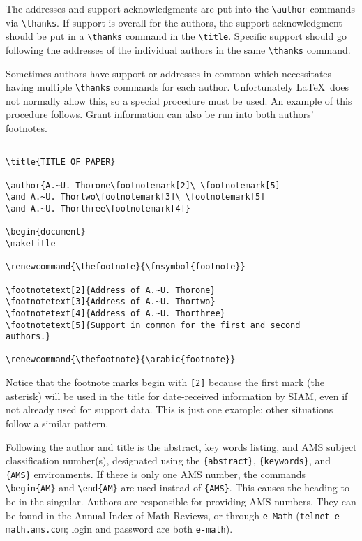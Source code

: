 \documentclass[final,leqno,onefignum,onetabnum]{siamltex1213}
\begin{document}
The addresses and support acknowledgments are put into the
\verb|\author| commands via \verb|\thanks|. If support is
overall for the authors, the support acknowledgment should
be put in a \verb|\thanks| command in the \verb|\title|.
Specific support should go following the addresses of the
individual authors in the same \verb|\thanks| command.

Sometimes authors have support or addresses in common which
necessitates having multiple \verb|\thanks| commands for
each author. Unfortunately \LaTeX\ does not normally allow this, 
so a special procedure must be used. An example of this procedure
follows. Grant information can also be run into both authors' 
footnotes.

\begin{verbatim}

\title{TITLE OF PAPER}

\author{A.~U. Thorone\footnotemark[2]\ \footnotemark[5]
\and A.~U. Thortwo\footnotemark[3]\ \footnotemark[5]
\and A.~U. Thorthree\footnotemark[4]}

\begin{document}
\maketitle

\renewcommand{\thefootnote}{\fnsymbol{footnote}}

\footnotetext[2]{Address of A.~U. Thorone}
\footnotetext[3]{Address of A.~U. Thortwo}
\footnotetext[4]{Address of A.~U. Thorthree}
\footnotetext[5]{Support in common for the first and second
authors.}

\renewcommand{\thefootnote}{\arabic{footnote}}

\end{verbatim}

Notice that the footnote marks begin with {\tt [2]}
because the first mark (the asterisk) will be used in the
title for date-received information by SIAM, even if not
already used for support data. This is just one example;
other situations follow a similar pattern.

Following the author and title is the abstract, key words
listing, and AMS subject classification number(s),
designated using the \verb|{abstract}|, \verb|{keywords}|,
and \verb|{AMS}| environments. If
there is only one AMS number, the commands
\verb|\begin{AM}| and \verb|\end{AM}| are used
instead of \verb|{AMS}|. This causes the heading to be
in the singular. Authors are responsible for providing AMS numbers.
They can be found in the Annual Index of Math Reviews, or
through {\tt e-Math} ({\tt telnet e-math.ams.com}; login
and password are both {\tt e-math}).   
\end{document}
